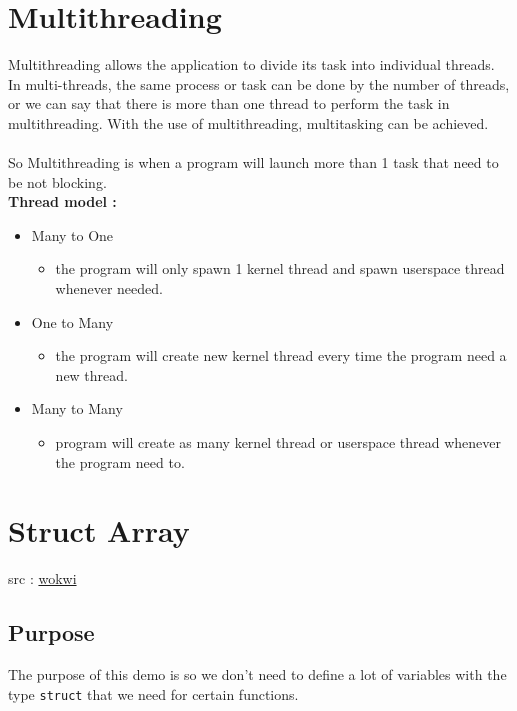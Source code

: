 \documentclass{article}
\begin{document}
\section{Multithreading}
Multithreading allows the application to divide its task into individual threads. In multi-threads, the same process or task can be done by the number of threads, or we can say that there is more than one thread to perform the task in multithreading. With the use of multithreading, multitasking can be achieved.\\
\\
So Multithreading is when a program will launch more than 1 task that need to be not blocking. \\

\textbf{Thread model :}\

\begin{itemize}
    \item Many to One
        \begin{itemize}[label=-]
            \item the program will only spawn 1 kernel thread and spawn userspace thread whenever needed.
        \end{itemize}
    \item One to Many
        \begin{itemize}[label=-]
            \item the program will create new kernel thread every time the program need a new thread.
        \end{itemize}
    \item Many to Many
        \begin{itemize}[label=-]
            \item program will create as many kernel thread or userspace thread whenever the program need to.
        \end{itemize}
\end{itemize}

\section{Struct Array}
src : \href{https://wokwi.com/projects/397773181397780481}{wokwi}\\

\subsection*{Purpose}
The purpose of this demo is so we don't need to define a lot of variables with the type \texttt{struct} that we need for certain functions.
\end{document}
